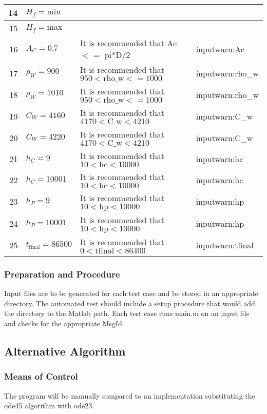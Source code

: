 \documentclass[12pt]{article}
\begin{document}
\begin{center}
\begin{longtable}{ | r | p{3cm} | p{5cm} | p{4cm} |}
	14 & $H_f = \text{min}$ & & \\ \hline
	15 & $H_f = \text{max}$ & & \\ \hline
	16 & $A_C = 0.7$ & It is recommended that Ac $<=$ pi*D/2 & inputwarn:Ac\\ \hline
	17 & $\rho_W = 900$ & It is recommended that $950 < \text{rho\_{w}} <= 1000$ & inputwarn:rho\_{w} \\ \hline
	18 & $\rho_W = 1010$ & It is recommended that $950 < \text{rho\_{w}} <= 1000$ & inputwarn:rho\_{w} \\ \hline
	19 & $C_W = 4160$ & It is recommended that $4170 < \text{C\_{w}} < 4210$ & inputwarn:C\_{w} \\ \hline
	20 & $C_W = 4220$ & It is recommended that $4170 < \text{C\_{w}} < 4210$ & inputwarn:C\_{w} \\ \hline
	21 & $h_C = 9$ & It is recommended that $10 < \text{hc} < 10000$ & inputwarn:hc \\ \hline
	22 & $h_C = 10001$ & It is recommended that $10 < \text{hc} < 10000$ & inputwarn:hc \\ \hline
	23 & $h_P = 9$ & It is recommended that $10 < \text{hp} < 10000$ & inputwarn:hp \\ \hline
	24 & $h_P = 10001$ & It is recommended that $10 < \text{hp} < 10000$ & inputwarn:hp \\ \hline
	25 & $t_{\text{final}} = 86500$ & It is recommended that $0 < \text{tfinal} < 86400$ & inputwarn:tfinal \\ \hline
	\end{longtable}
\end{center}

\subsubsection{Preparation and Procedure}
Input files are to be generated for each test case and be stored in an appropriate
 directory. The automated test should include a setup procedure that would add 
 the directory to the Matlab path. Each test case runs main.m on an input file
  and checks for the appropriate MsgId. 

\subsection{Alternative Algorithm}
\subsubsection{Means of Control}
The program will be manually compared to an implementation substituting the ode45
 algorithm with ode23. 
\end{document}
